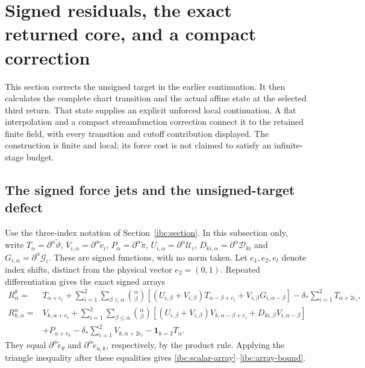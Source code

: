 \section{Signed residuals, the exact returned core, and a compact correction}
\label{irc:section}

This section corrects the unsigned target in the earlier continuation.
It then calculates the complete chart transition and the actual affine
state at the selected third return.  That state supplies an explicit
unforced local continuation.  A flat interpolation and a compact
streamfunction correction connect it to the retained finite field,
with every transition and cutoff contribution displayed.  The
construction is finite and local; its force cost is not claimed to
satisfy an infinite-stage budget.

\subsection{The signed force jets and the unsigned-target defect}

Use the three-index notation of Section~\ref{ibc:section}.  In this
subsection only, write $T_\alpha=\partial^\alpha\widetilde\vartheta$,
$V_{i,\alpha}=\partial^\alpha\widetilde v_i$,
$P_\alpha=\partial^\alpha\widetilde\pi$,
$U_{i,\alpha}=\partial^\alpha\mathcal U_i$,
$D_{ki,\alpha}=\partial^\alpha\mathcal D_{ki}$ and
$G_{i,\alpha}=\partial^\alpha\mathcal G_i$.
These are signed functions, with no norm taken.  Let $e_1,e_2,e_t$
denote index shifts, distinct from the physical vector $e_2=(0,1)$.
Repeated differentiation gives the exact signed arrays
\begin{align}
 R^\theta_\alpha={}&T_{\alpha+e_t}
 +\sum_{i=1}^2\sum_{\beta\leq\alpha}\binom\alpha\beta
 \left[(U_{i,\beta}+V_{i,\beta})T_{\alpha-\beta+e_i}
       +V_{i,\beta}G_{i,\alpha-\beta}\right]
 -\delta_*\sum_{i=1}^2T_{\alpha+2e_i},
 \label{irc:signed-scalar}\\
 R^u_{k,\alpha}={}&V_{k,\alpha+e_t}
 +\sum_{i=1}^2\sum_{\beta\leq\alpha}\binom\alpha\beta
 \left[(U_{i,\beta}+V_{i,\beta})V_{k,\alpha-\beta+e_i}
       +D_{ki,\beta}V_{i,\alpha-\beta}\right]\nonumber\\
 &+P_{\alpha+e_k}-\delta_*\sum_{i=1}^2V_{k,\alpha+2e_i}
       -\mathbf1_{k=2}T_\alpha.
 \label{irc:signed-vector}
\end{align}
They equal $\partial^\alpha\widetilde e_\theta$ and
$\partial^\alpha\widetilde e_{u,k}$, respectively, by the product
rule.  Applying the triangle inequality after these equalities gives
\eqref{ibc:scalar-array}--\eqref{ibc:array-bound}.

